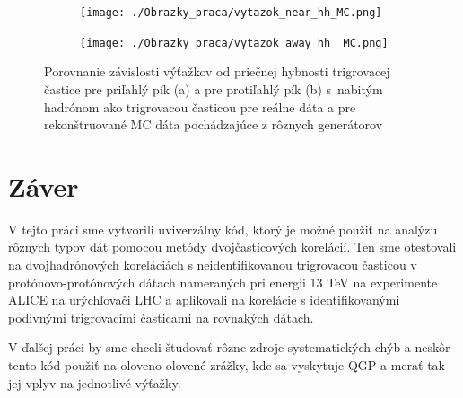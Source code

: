 \documentclass[thesismargins, thesislinespacing]{rnthesis}
\begin{document}
\begin{figure}[hbtp!]
	\centering
	\begin{subfigure}{0.5\textwidth}
		\centering
		\texttt{[image: ./Obrazky\_praca/vytazok\_near\_hh\_MC.png]}
		\caption{}
	\end{subfigure}%
	\begin{subfigure}{0.5\textwidth}
		\centering
		\texttt{[image: ./Obrazky\_praca/vytazok\_away\_hh\_\_MC.png]}
		\caption{}
	\end{subfigure}
	\caption{Porovnanie závislosti výťažkov od priečnej hybnosti trigrovacej častice pre priľahlý pík (a) a pre protiľahlý pík (b) s~nabitým hadrónom ako trigrovacou časticou pre reálne dáta a pre rekonštruované MC dáta pochádzajúce z rôznych generátorov}
	\label{porovnanieh}
\end{figure}


\chapter{Záver}

V tejto práci sme vytvorili uviverzálny kód, ktorý je možné použiť na analýzu rôznych typov dát pomocou metódy dvojčasticových korelácií. Ten sme otestovali na dvojhadrónových koreláciách s neidentifikovanou trigrovacou časticou v protónovo-protónových dátach nameraných pri energii 13 TeV na experimente ALICE na urýchľovači LHC a aplikovali na korelácie s identifikovanými podivnými trigrovacími časticami na rovnakých dátach.

V ďalšej práci by sme chceli študovať rôzne zdroje systematických chýb a neskôr tento kód použiť na oloveno-olovené zrážky, kde sa vyskytuje QGP a merať tak jej vplyv na jednotlivé výťažky. 



%

\end{document}
